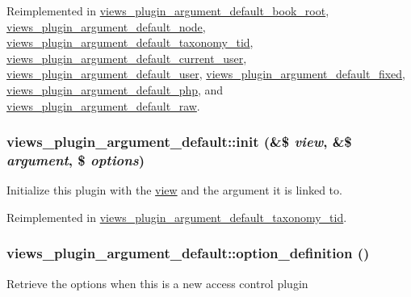 Reimplemented in \hyperlink{classviews__plugin__argument__default__book__root_a9bc64d2056dce0bc3f98b9d31294fec3}{views\_\-plugin\_\-argument\_\-default\_\-book\_\-root}, \hyperlink{classviews__plugin__argument__default__node_a1191e03f5150b371f2fc5911726a4b60}{views\_\-plugin\_\-argument\_\-default\_\-node}, \hyperlink{classviews__plugin__argument__default__taxonomy__tid_a60700fa190086256f0fe26034320faff}{views\_\-plugin\_\-argument\_\-default\_\-taxonomy\_\-tid}, \hyperlink{classviews__plugin__argument__default__current__user_aa17e9b1b32a46e9030cf2edd0ed074b8}{views\_\-plugin\_\-argument\_\-default\_\-current\_\-user}, \hyperlink{classviews__plugin__argument__default__user_af7dc56a3ce8a8cf8ad12595952dc70e6}{views\_\-plugin\_\-argument\_\-default\_\-user}, \hyperlink{classviews__plugin__argument__default__fixed_a4790728e6d3cae3a3a6fa5f63357a1fb}{views\_\-plugin\_\-argument\_\-default\_\-fixed}, \hyperlink{classviews__plugin__argument__default__php_a2f714a25b2da5a135daa28adfab84eb9}{views\_\-plugin\_\-argument\_\-default\_\-php}, and \hyperlink{classviews__plugin__argument__default__raw_ada03531d4b1fb35b222662c5f44e0eec}{views\_\-plugin\_\-argument\_\-default\_\-raw}.\hypertarget{classviews__plugin__argument__default_a42928a46a7152d94beae91f781a5b845}{
\subsubsection[{init}]{\setlength{\rightskip}{0pt plus 5cm}views\_\-plugin\_\-argument\_\-default::init (\&\$ {\em view}, \/  \&\$ {\em argument}, \/  \$ {\em options})}}
\label{classviews__plugin__argument__default_a42928a46a7152d94beae91f781a5b845}
Initialize this plugin with the \hyperlink{classview}{view} and the argument it is linked to. 

Reimplemented in \hyperlink{classviews__plugin__argument__default__taxonomy__tid_a944b41dc55d61139357d7b343d0a185e}{views\_\-plugin\_\-argument\_\-default\_\-taxonomy\_\-tid}.\hypertarget{classviews__plugin__argument__default_ac3a58218880857bc009d4617fab2241b}{
\subsubsection[{option\_\-definition}]{\setlength{\rightskip}{0pt plus 5cm}views\_\-plugin\_\-argument\_\-default::option\_\-definition ()}}
\label{classviews__plugin__argument__default_ac3a58218880857bc009d4617fab2241b}
Retrieve the options when this is a new access control plugin 

